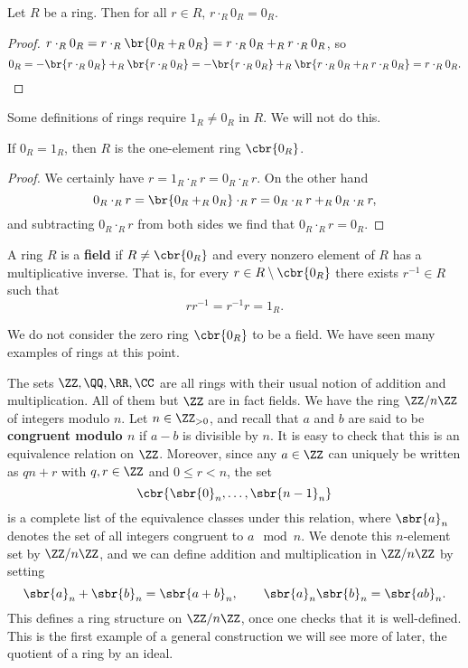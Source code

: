 \begin{proposition}
Let $ R $ be a ring. Then for all $ r \in R $, $ r \cdot_R 0_R = 0_R $.
\end{proposition}

\begin{proof}
$ r \cdot_R 0_R = r \cdot_R \br{0_R +_R 0_R} = r \cdot_R 0_R +_R r \cdot_R 0_R $, so
$$ 0_R = -\br{r \cdot_R 0_R} +_R \br{r \cdot_R 0_R} = -\br{r \cdot_R 0_R} +_R \br{r \cdot_R 0_R +_R r \cdot_R 0_R} = r \cdot_R 0_R. $$
\end{proof}

\begin{note*}
Some definitions of rings require $ 1_R \ne 0_R $ in $ R $. We will not do this.
\end{note*}

\begin{proposition}
If $ 0_R = 1_R $, then $ R $ is the one-element ring $ \cbr{0_R} $.
\end{proposition}

\begin{proof}
We certainly have $ r = 1_R \cdot_R r = 0_R \cdot_R r $. On the other hand
$$ 0_R \cdot_R r = \br{0_R +_R 0_R} \cdot_R r = 0_R \cdot_R r +_R 0_R \cdot_R r, $$
and subtracting $ 0_R \cdot_R r $ from both sides we find that $ 0_R \cdot_R r = 0_R $.
\end{proof}

\begin{definition}
A ring $ R $ is a \textbf{field} if $ R \ne \cbr{0_R} $ and every nonzero element of $ R $ has a multiplicative inverse. That is, for every $ r \in R \setminus \cbr{0_R} $ there exists $ r^{-1} \in R $ such that
$$ rr^{-1} = r^{-1}r = 1_R. $$
\end{definition}

We do not consider the zero ring $ \cbr{0_R} $ to be a field. We have seen many examples of rings at this point.

\pagebreak

\begin{example*}
The sets $ \ZZ, \QQ, \RR, \CC $ are all rings with their usual notion of addition and multiplication. All of them but $ \ZZ $ are in fact fields. We have the ring $ \ZZ / n\ZZ $ of integers modulo $ n $. Let $ n \in \ZZ_{> 0} $, and recall that $ a $ and $ b $ are said to be \textbf{congruent modulo $ n $} if $ a - b $ is divisible by $ n $. It is easy to check that this is an equivalence relation on $ \ZZ $. Moreover, since any $ a \in \ZZ $ can uniquely be written as $ qn + r $ with $ q, r \in \ZZ $ and $ 0 \le r < n $, the set
$$ \cbr{\sbr{0}_n, \dots, \sbr{n - 1}_n} $$
is a complete list of the equivalence classes under this relation, where $ \sbr{a}_n $ denotes the set of all integers congruent to $ a \mod n $. We denote this $ n $-element set by $ \ZZ / n\ZZ $, and we can define addition and multiplication in $ \ZZ / n\ZZ $ by setting
$$ \sbr{a}_n + \sbr{b}_n = \sbr{a + b}_n, \qquad \sbr{a}_n\sbr{b}_n = \sbr{ab}_n. $$
This defines a ring structure on $ \ZZ / n\ZZ $, once one checks that it is well-defined. This is the first example of a general construction we will see more of later, the quotient of a ring by an ideal.
\end{example*}

